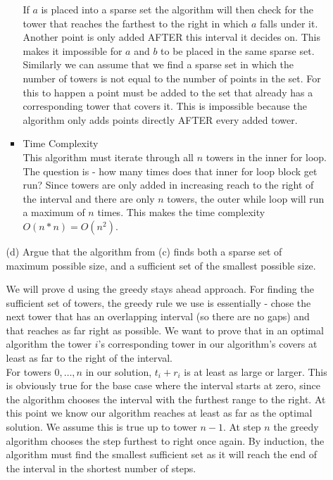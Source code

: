 \documentclass[letterpaper,11pt]{article}
\begin{document}
\begin{enumerate}
\begin{enumerate}
\begin{itemize}
    If $a$ is placed into a sparse set the algorithm will then check for the 
    tower that reaches the farthest to the right in which $a$ falls under it.
    Another point is only added AFTER this interval it decides on. This makes
    it impossible for $a$ and $b$ to be placed in the same sparse set.\\

    Similarly we can assume that we find a sparse set in which the number of 
    towers is not equal to the number of points in the set. For this to happen
    a point must be added to the set that already has a corresponding tower
    that covers it. This is impossible because the algorithm only adds points 
    directly AFTER every added tower. \\

\item Time Complexity\\
    This algorithm must iterate through all $n$ towers in the inner for loop. 
    The question is - how many times does that inner for loop block get run?
    Since towers are only added in increasing reach to the right of the interval
    and there are only $n$ towers, the outer while loop will run a maximum of 
    $n$ times. This makes the time complexity $O\left( n*n \right) = O\left( n^2 \right) $.



        \end{itemize}
    
        \newpage
    \item [(d)] Argue that the algorithm from (c) finds both a sparse set of maximum possible size, and a sufficient set of the smallest possible size. 
        \color{teal}

        We will prove d using the greedy stays ahead approach. For finding the 
        sufficient set of towers, the greedy rule we use is essentially - 
        chose the next tower that has an overlapping interval (so there are no
        gaps) and that reaches as far right as possible. We want to prove that 
        in an optimal algorithm the tower $i$'s corresponding tower in our 
        algorithm's covers at least as far to the right of the interval. \\

        For towers $0, \ldots, n$ in our solution, $t_i + r_i$ is at least as 
        large or larger. This is obviously true for the base case where the 
        interval starts at zero, since the algorithm chooses the interval with
        the furthest range to the right. At this point we know our algorithm 
        reaches at least as far as the optimal solution. We assume this is true
        up to tower $n - 1$. At step  $n$ the greedy algorithm chooses the step 
        furthest to right once again. By induction, the algorithm must find 
        the smallest sufficient set as it will reach the end of the interval
        in the shortest number of steps.\\


\end{enumerate}
\end{enumerate}
\end{document}
